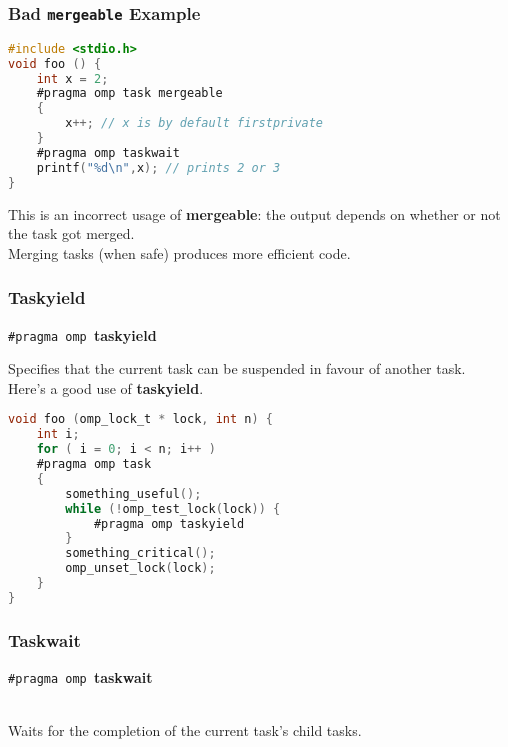\begin{frame}[fragile]
  \frametitle{Bad {\tt mergeable} Example}

  
  \begin{lstlisting}[language=C,morekeywords={foreach,pragma,omp,parallel,single,nowait,task,untied,barrier,taskyield,mergeable,final,taskwait,critical}]
#include <stdio.h>
void foo () {
    int x = 2;
    #pragma omp task mergeable
    {
        x++; // x is by default firstprivate
    }
    #pragma omp taskwait
    printf("%d\n",x); // prints 2 or 3
}
  \end{lstlisting}
  
    This is an incorrect usage of {\bf mergeable}: the output depends
      on whether or not the task got merged.\\[1em]
    Merging tasks (when safe) produces more efficient code.

  
\end{frame}

\begin{frame}[fragile]
  \frametitle{Taskyield}

  
  \begin{center}
    {\tt \#pragma omp }{\bf taskyield}
  \end{center}

    Specifies that the current task can be suspended in favour of another task.\\[1em]

  Here's a good use of {\bf taskyield}.

  \begin{lstlisting}[language=C,morekeywords={foreach,pragma,omp,parallel,single,nowait,task,untied,barrier,taskyield,mergeable,final,taskwait,critical}]
void foo (omp_lock_t * lock, int n) {
    int i;
    for ( i = 0; i < n; i++ )
    #pragma omp task
    {
        something_useful();
        while (!omp_test_lock(lock)) {
            #pragma omp taskyield
        }
        something_critical();
        omp_unset_lock(lock);
    }
}
  \end{lstlisting}
  
\end{frame}

\begin{frame}[fragile]
  \frametitle{Taskwait}

  

  \begin{center}
    {\tt \#pragma omp }{\bf taskwait}
  \end{center}~\\[1em]

     Waits for the completion of the current task's child tasks.
  

\end{frame}

